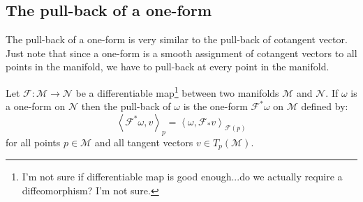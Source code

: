 \begin{remark}
      \subsection{The pull-back of a one-form}
        The pull-back of a one-form is very similar to the pull-back of
        cotangent vector. Just note that since a one-form is a smooth
        assignment of cotangent vectors to all points in the manifold, we have to pull-back at every point in the manifold.
        \begin{definition}
          Let $\mathcal{F}: \mathcal{M} \rightarrow \mathcal{N}$ be a
          differentiable map\footnote{I'm not sure if differentiable map is good enough...do we actually require a diffeomorphism? I'm not sure.} between two manifolds $\mathcal{M}$ and
          $\mathcal{N}$. If $\omega$ is a one-form on $\mathcal{N}$ then the
          pull-back of $\omega$ is the one-form $\mathcal{F}^*\omega$ on
          $\mathcal{M}$ defined by:
            \[\left\langle \mathcal{F}^*\omega, v \right\rangle_p =
            \left\langle \omega, \mathcal{F}_*v
            \right\rangle_{\mathcal{F}(p)} \]
          for all points $p \in \mathcal{M}$ and all tangent vectors $v \in T_p(\mathcal{M})$.
        \end{definition}
    \end{remark}

      